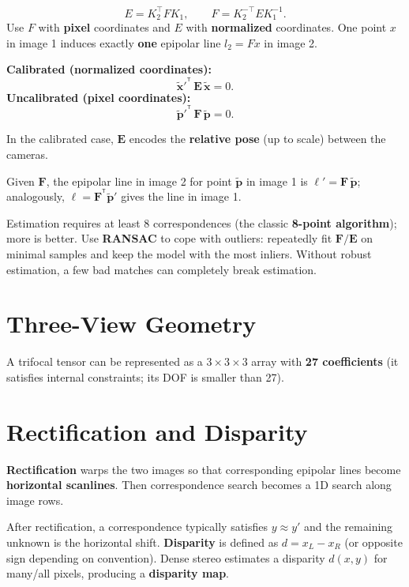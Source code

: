 \documentclass[11pt, oneside]{book}
\newcommand{\T}{^{\mathsf{T}}}
\newcommand{\vct}[1]{\bm{#1}}           %
\newcommand{\mat}[1]{\mathbf{#1}}       %
\begin{document}
\begin{thmbox}[title={Reprojection Error Minimization}]
\begin{defbox}[title={Correlation and Convolution}]
\begin{defbox}[title={ReLU and Pooling}]
\begin{defbox}[title={Segmentation}]
\begin{defbox}[title={Graph-Based Segmentation}]
\begin{defbox}[title={U-Net}]
\begin{defbox}[title={AP and mAP}]
\begin{thmbox}[title={E and F Relationship}]
\[
E = K_2^{\top} F K_1,
\qquad
F = K_2^{-\top} E K_1^{-1}.
\]
Use $F$ with \textbf{pixel} coordinates and $E$ with \textbf{normalized} coordinates.
One point $x$ in image 1 induces exactly \textbf{one} epipolar line $l_2 = F x$ in image 2.
\end{thmbox}

\begin{thmbox}[title={Epipolar Constraints}]
\textbf{Calibrated (normalized coordinates):}
\[
\tilde{\vct{x}}'^{\T}\,\mat{E}\,\tilde{\vct{x}} = 0.
\]
\textbf{Uncalibrated (pixel coordinates):}
\[
\tilde{\vct{p}}'^{\T}\,\mat{F}\,\tilde{\vct{p}} = 0.
\]
\end{thmbox}

In the calibrated case, $\mat{E}$ encodes the \textbf{relative pose} (up to scale) between the cameras.

Given $\mat{F}$, the epipolar line in image 2 for point $\tilde{\vct{p}}$ in image 1 is $\mat{\ell}' = \mat{F}\,\tilde{\vct{p}}$;
analogously, $\mat{\ell} = \mat{F}^{\T}\tilde{\vct{p}}'$ gives the line in image 1.

Estimation requires at least 8 correspondences (the classic \textbf{8-point algorithm}); more is better.
Use \textbf{RANSAC} to cope with outliers: repeatedly fit $\mat{F}/\mat{E}$ on minimal samples and keep the model with the most inliers.
Without robust estimation, a few bad matches can completely break estimation.

\section{Three-View Geometry}

A trifocal tensor can be represented as a $3\times3\times3$ array with \textbf{27 coefficients}
(it satisfies internal constraints; its DOF is smaller than 27).

\section{Rectification and Disparity}

\begin{defbox}[title={Rectification}]
\textbf{Rectification} warps the two images so that corresponding epipolar lines become \textbf{horizontal scanlines}.
Then correspondence search becomes a 1D search along image rows.
\end{defbox}

After rectification, a correspondence typically satisfies $y \approx y'$ and the remaining unknown is the horizontal shift.
\textbf{Disparity} is defined as $d = x_L - x_R$ (or opposite sign depending on convention).
Dense stereo estimates a disparity $d(x,y)$ for many/all pixels, producing a \textbf{disparity map}.


\end{defbox}
\end{defbox}
\end{defbox}
\end{defbox}
\end{defbox}
\end{defbox}
\end{thmbox}
\end{document}
